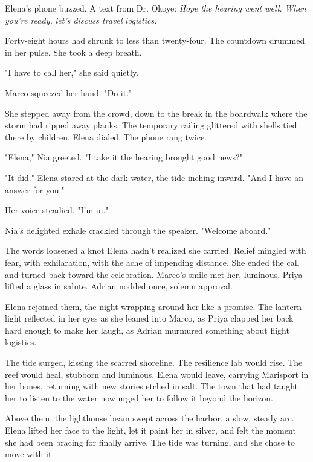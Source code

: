Elena's phone buzzed. A text from Dr. Okoye: \textit{Hope the hearing went well. When you're ready, let's discuss travel logistics.}\

Forty-eight hours had shrunk to less than twenty-four. The countdown drummed in her pulse. She took a deep breath.

"I have to call her," she said quietly.

Marco squeezed her hand. "Do it."

She stepped away from the crowd, down to the break in the boardwalk where the storm had ripped away planks. The temporary railing glittered with shells tied there by children. Elena dialed. The phone rang twice.

"Elena," Nia greeted. "I take it the hearing brought good news?"

"It did." Elena stared at the dark water, the tide inching inward. "And I have an answer for you."

Her voice steadied. "I'm in."

Nia's delighted exhale crackled through the speaker. "Welcome aboard."

The words loosened a knot Elena hadn't realized she carried. Relief mingled with fear, with exhilaration, with the ache of impending distance. She ended the call and turned back toward the celebration. Marco's smile met her, luminous. Priya lifted a glass in salute. Adrian nodded once, solemn approval.

Elena rejoined them, the night wrapping around her like a promise. The lantern light reflected in her eyes as she leaned into Marco, as Priya clapped her back hard enough to make her laugh, as Adrian murmured something about flight logistics.

The tide surged, kissing the scarred shoreline. The resilience lab would rise. The reef would heal, stubborn and luminous. Elena would leave, carrying Marisport in her bones, returning with new stories etched in salt. The town that had taught her to listen to the water now urged her to follow it beyond the horizon.

Above them, the lighthouse beam swept across the harbor, a slow, steady arc. Elena lifted her face to the light, let it paint her in silver, and felt the moment she had been bracing for finally arrive. The tide was turning, and she chose to move with it.
